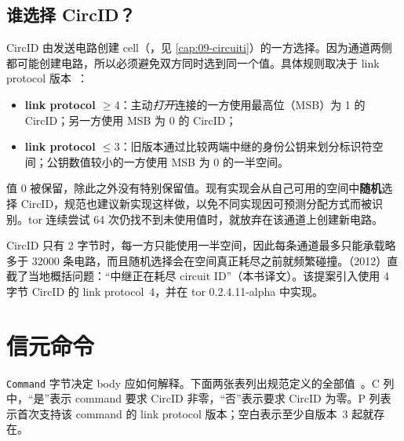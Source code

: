 \subsection{谁选择 CircID？}

CircID 由发送电路创建 cell（，见 \cref{cap:09-circuiti}）的一方选择。因为通道两侧都可能创建电路，所以必须避免双方同时选到同一个值。具体规则取决于 link protocol 版本~：
\begin{itemize}
  \item \textbf{link protocol $\ge 4$}：主动\emph{打开}连接的一方使用最高位（MSB）为 1 的 CircID；另一方使用 MSB 为 0 的 CircID；
  \item \textbf{link protocol $\le 3$}：旧版本通过比较两端中继的身份公钥来划分标识符空间；公钥数值较小的一方使用 MSB 为 0 的一半空间。
\end{itemize}

值 0 被保留，除此之外没有特别保留值。现有实现会从自己可用的空间中\textbf{随机}选择 CircID，规范也建议新实现这样做，以免不同实现因可预测分配方式而被识别。tor 连续尝试 64 次仍找不到未使用值时，就放弃在该通道上创建新电路。

\begin{approfondimento}[为什么扩展到 4 字节？]
CircID 只有 2 字节时，每一方只能使用一半空间，因此每条通道最多只能承载略多于 \num{32000} 条电路，而且随机选择会在空间真正耗尽之前就频繁碰撞。（2012）直截了当地概括问题：\enquote{中继正在耗尽 circuit ID}（本书译文）。该提案引入使用 4 字节 CircID 的 link protocol~4，并在 tor 0.2.4.11-alpha 中实现。
\end{approfondimento}

\section{信元命令}\label{sec:comandi}

\texttt{Command} 字节决定 body 应如何解释。下面两张表列出规范定义的全部值~。C 列中，\enquote{是}表示 command 要求 CircID 非零，\enquote{否}表示要求 CircID 为零。P 列表示首次支持该 command 的 link protocol 版本；空白表示至少自版本~3 起就存在。

